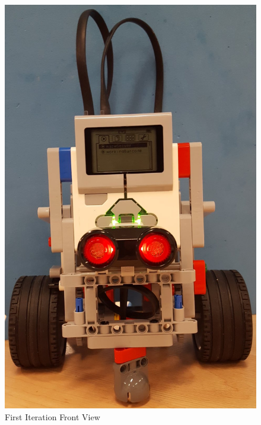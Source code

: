 \documentclass[11pt]{article}
\begin{document}
\begin{figure}[!tbp]
  \centering
  \begin{minipage}[b]{0.33\textwidth}
\includegraphics[scale=0.18]{images/Hardware_Mechanical/First_Iteration_Front.jpg}
\caption{First Iteration Front View}\label{fig:Front View}
  \end{minipage}
  \hfill
  \begin{minipage}[b]{0.4\textwidth}

\end{minipage}
\end{figure}
\end{document}
